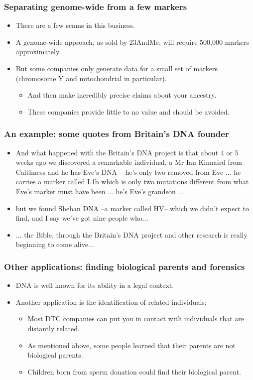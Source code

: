 \documentclass{beamer}
\begin{document}
\begin{frame}
  \frametitle{Separating genome-wide from a few markers}
   \begin{itemize}
   \item There are a few scams in this business.
   \item A genome-wide approach, as sold by 23AndMe, will require 500,000 markers approximately.
   \item But some companies only generate data for a small set of markers (chromosome Y and mitochondrial in particular).
     \begin{itemize}
     \item And then make incredibly precise claims about your ancestry.
     \item These companies provide little to no value and should be avoided.
     \end{itemize}
   \end{itemize}
\end{frame}


\begin{frame}
  \frametitle{An example: some quotes from Britain's DNA founder}
   \begin{itemize}
   \item And what happened with the Britain's DNA project is that about 4 or 5 weeks ago we discovered a remarkable individual, a Mr Ian Kinnaird from Caithness and he has Eve's DNA – he's only two removed from Eve ... he carries a marker called L1b which is only two mutations different from what Eve's marker must have been ... he's Eve's grandson ... 
   \item but we found Sheban DNA –a marker called HV– which we didn’t expect to find, and I say we've got nine people who...
   \item ... the Bible, through the Britain's DNA project and other research is really beginning to come alive...
   \end{itemize}
\end{frame}

\begin{frame}
  \frametitle{Other applications: finding biological parents and forensics}
  \begin{itemize}
  \item DNA is well known for its ability in a legal context.
  \item Another application is the identification of related individuals:
    \begin{itemize}
    \item Most DTC companies can put you in contact with individuals that are distantly related.
    \item As mentioned above, some people learned that their parents are not biological parents.
    \item Children born from sperm donation could find their biological parent.
    \end{itemize}
  \end{itemize}
\end{frame}
\end{document}
